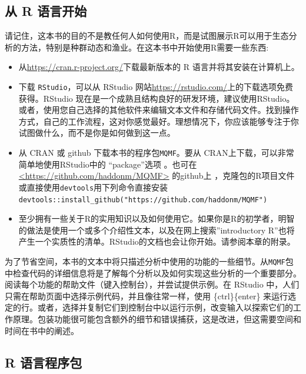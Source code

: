 \documentclass[
  lang=cn,
  11pt,
  scheme=chinese,
  chinesefont=nofont,
  citestyle=gb7714-2015,
  bibstyle=gb7714-2015]{elegantbook}
\begin{document}
\subsection{从 R 语言开始}\label{ux4ece-r-ux8bedux8a00ux5f00ux59cb}

请记住，这本书的目的不是教任何人如何使用R，而是试图展示R可以用于生态分析的方法，特别是种群动态和渔业。在这本书中开始使用R需要一些东西:

\begin{itemize}
\item
  从\url{https://cran.r-project.org/}下载最新版本的 R 语言并将其安装在计算机上。
\item
  下载 \texttt{RStudio}，可以从 RStudio 网站\url{https://rstudio.com/}上的下载选项免费获得。RStudio 现在是一个成熟且结构良好的研发环境，建议使用RStudio。或者，使用您自己选择的其他软件来编辑文本文件和存储代码文件。找到操作方式，自己的工作流程，这对你感觉最好。理想情况下，你应该能够专注于你试图做什么，而不是你是如何做到这一点。
\item
  从 CRAN 或 github 下载本书的程序包\texttt{MQMF}。要从 CRAN上下载，可以非常简单地使用RStudio中的 ``package''选项 。也可在 \href{https://github.com/haddonm/MQMF}{\textless https://github.com/haddonm/MQMF\textgreater{}} 的github上 ，克隆包的R项目文件或直接使用\texttt{devtools}用下列命令直接安装\texttt{devtools::install\_github("https://github.com/haddonm/MQMF")}
\item
  至少拥有一些关于R的实用知识以及如何使用它。如果你是R的初学者，明智的做法是使用一个或多个介绍性文本，以及在网上搜索''introductory R''也将产生一个实质性的清单。RStudio的文档也会让你开始。请参阅本章的附录。
\end{itemize}

为了节省空间，本书的文本中将只描述分析中使用的功能的一些细节。从\texttt{MQMF}包中检查代码的详细信息将是了解每个分析以及如何实现这些分析的一个重要部分。阅读每个功能的帮助文件（键入控制台），并尝试提供示例。在 RStudio 中，人们只需在帮助页面中选择示例代码，并且像往常一样，使用 \{ctrl\}\{enter\} 来运行选定的行。或者，选择并复制它们到控制台中以运行示例，改变输入以探索它们的工作原理。包装功能很可能包含额外的细节和错误捕获，这是改进，但这需要空间和时间在书中的阐述。

\subsection{R 语言程序包}\label{r-ux8bedux8a00ux7a0bux5e8fux5305}
\end{document}
